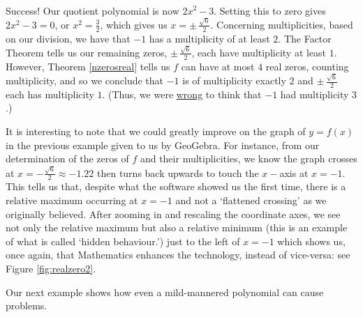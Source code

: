 {\begin{enumerate}
{\[\begin{array}{cccccccccc}
\end{array}\]

\setlength\arraycolsep{5pt}
\setlength\extrarowheight{0pt}

}
Success!  Our quotient polynomial is now $2x^2 - 3$.  Setting this to zero gives $2x^2 - 3 = 0$, or $x^2 = \frac{3}{2}$, which gives us $x = \pm \, \frac{\sqrt{6}}{2}$.  Concerning multiplicities, based on our division, we have that $-1$ has a multiplicity of at least $2$. The Factor Theorem tells us our remaining zeros, $\pm \, \frac{\sqrt{6}}{2}$, each have multiplicity at least $1$.  However, Theorem \ref{nzerosreal} tells us $f$ can have at most $4$ real zeros, counting multiplicity, and so we conclude that $-1$ is of multiplicity exactly $2$ and $\pm \, \frac{\sqrt{6}}{2}$ each has multiplicity $1$.  (Thus, we were \underline{wrong} to think that $-1$ had multiplicity $3$.) 

\end{enumerate}
}

It is interesting to note that we could greatly improve on the graph of $y=f(x)$ in the previous example given to us by GeoGebra. For instance, from our determination of the zeros of $f$ and their multiplicities, we know the graph crosses at $x=-\frac{\sqrt{6}}{2} \approx -1.22$ then turns back upwards to touch the $x-$axis at $x=-1$. This tells us that, despite what the software showed us the first time, there is a relative maximum occurring at $x = -1$ and not a `flattened crossing' as we originally believed.  After zooming in and rescaling the coordinate axes, we see not only the relative maximum but also a relative minimum (this is an example of what is called `hidden behaviour.') just to the left of $x = -1$ which shows us, once again, that Mathematics enhances the technology, instead of vice-versa: see Figure \ref{fig:realzero2}.




Our next example shows how even a mild-mannered polynomial can cause problems.

